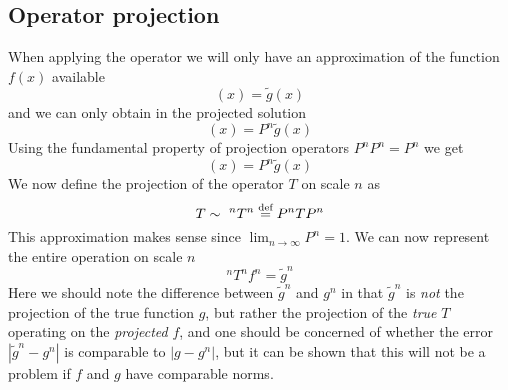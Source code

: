\subsection{Operator projection}
When applying the operator we will only have an approximation of the 
function $f(x)$ available
\begin{equation}
	[TP^nf](x) = \tilde{g}(x)
\end{equation}
and we can only obtain in the projected solution
\begin{equation}
	[P^nTP^nf](x) = P^n\tilde{g}(x)
\end{equation}
Using the fundamental property of projection operators $P^nP^n = P^n$ we get
\begin{equation}
	[P^nTP^nP^nf](x) = P^n\tilde{g}(x)
\end{equation}
We now define the projection of the operator $T$ on scale $n$ as
\begin{equation}
	\label{eq:defTn}
	T \sim\ ^nT^n \stackrel{\text{def}}{\hbox{=}} P^nTP^n
\end{equation}
This approximation makes sense since $\lim_{n\to\infty} P^n = 1$. We can now
represent the entire operation on scale $n$
\begin{equation}
	^nT^nf^n = \tilde{g}^n
\end{equation}
Here we should note the difference between $\tilde{g}^n$ and $g^n$ in that
$\tilde{g}^n$ is \emph{not} the projection of the true function $g$, but
rather the projection of the \emph{true} $T$ operating on the \emph{projected}
$f$, and one should be concerned of whether the error $|\tilde{g}^n - g^n|$ is
comparable to $|g - g^n|$, but it can be shown \cite{Fossgaard} that this will 
not be a 
problem if $f$ and $g$ have comparable norms.

